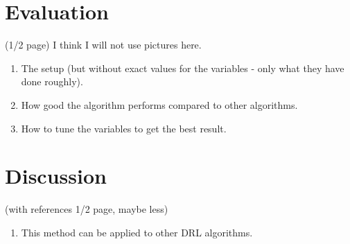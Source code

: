 \section{Evaluation}%
\label{sec:evaluation}
(1/2 page)
I think I will not use pictures here.
\begin{enumerate}
\item  The setup (but without exact values for the variables -  only what they have done roughly).
\item How good the algorithm performs compared to other algorithms.
\item How to tune the variables to get the best result.
\end{enumerate}



\section{Discussion} %
\label{sec:relwork}
(with references 1/2 page, maybe less)
\begin {enumerate}
\item This method can be applied to other DRL algorithms.
\end{enumerate}




%


 
